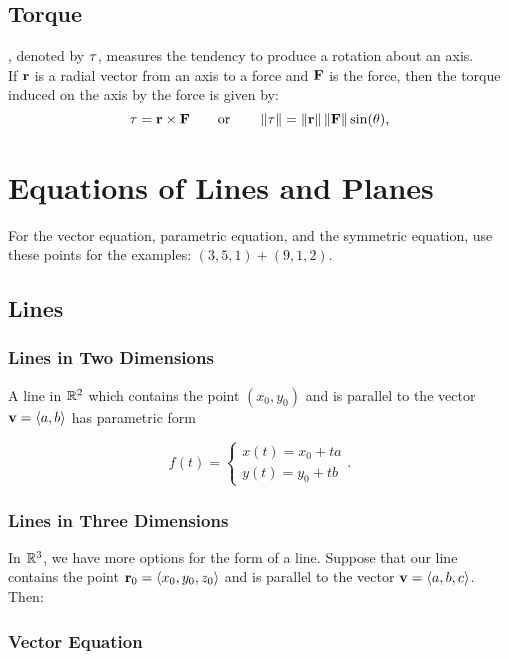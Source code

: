 \subsection{Torque}

, denoted by \(\mathbf{\tau}\), measures the tendency to produce a rotation about an axis. \\

If \(\mathbf{r}\) is a radial vector from an axis to a force and \(\mathbf{F}\) is the force, then the torque induced on the axis by the force is given by:
\[
    \mathbf{\tau} = \mathbf{r} \times \mathbf{F} \qquad \text{or} \qquad \left\lVert \mathbf{\mathbf{\tau}}\right\rVert = \left\lVert \mathbf{r}\right\rVert\left\lVert \mathbf{F}\right\rVert\sin(\theta),
\]

\section{Equations of Lines and Planes}

For the vector equation, parametric equation, and the symmetric equation, use these points for the examples: \((3,5,1) + (9,1,2)\).

\subsection{Lines}

\subsubsection{Lines in Two Dimensions}

A line in \(\mathbb{R}^{2}\) which contains the point \((x_{0},y_{0})\) and is parallel to the vector \(\mathbf{v} = \langle a,b \rangle\) has parametric form

\[
    f(t) = \begin{cases}
        x(t) = x_{0} + ta \\
        y(t) = y_{0} + tb
    \end{cases}.
\]

\subsubsection{Lines in Three Dimensions}

In \(\mathbb{R}^{3}\), we have more options for the form of a line. Suppose that our line contains the point \(\mathbf{r}_{0} = \langle x_{0},y_{0},z_{0} \rangle\) and is parallel to the vector \(\mathbf{v} = \langle a,b,c \rangle\). Then:

\subsubsection{Vector Equation}


